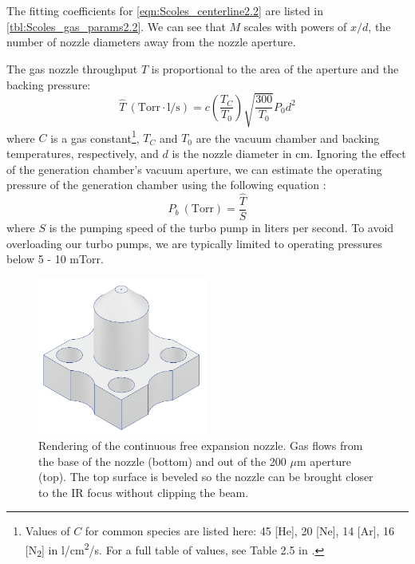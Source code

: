 The fitting coefficients for \cref{eqn:Scoles_centerline2.2} are listed in \cref{tbl:Scoles_gas_params2.2}. We can see that $M$ scales with powers of $x/d$, the number of nozzle diameters away from the nozzle aperture.

The gas nozzle throughput $\hat{T}$ is proportional to the area of the aperture and the backing pressure:
\begin{equation}
\hat{T} \ (\text{Torr} \cdot \text{l}/\text{s}) = c \left(\frac{T_C}{T_0} \right)\sqrt{\frac{300}{T_0}} P_0 d^2
\label{eqn:nozzle_thruput}
\end{equation}
where $C$ is a gas constant\footnote{Values of $C$ for common species are listed here: 45 [He], 20 [Ne], 14 [Ar], 16 [N\textsubscript{2}] in l/cm\textsuperscript{2}/s. For a full table of values, see Table 2.5 in \cite{millerFreeJetSources1988}.}, $T_C$ and $T_0$ are the vacuum chamber and backing temperatures, respectively, and $d$ is the nozzle diameter in cm. Ignoring the effect of the generation chamber's vacuum aperture, we can estimate the operating pressure of the generation chamber using the following equation \cite{hablanianHighvacuumTechnologyPractical1997}:
\begin{equation}
P_b \ (\text{Torr}) = \frac{\hat{T}}{S}
\end{equation}
where $S$ is the pumping speed of the turbo pump in liters per second. To avoid overloading our turbo pumps, we are typically limited to operating pressures below 5 - 10 mTorr.

\begin{figure}
	\centering
	\includegraphics[width=0.5\textwidth]{figures/chap3/gas_nozzle.png}
	\caption{Rendering of the continuous free expansion nozzle. Gas flows from the base of the nozzle (bottom) and out of the 200 $\mu$m aperture (top). The top surface is beveled so the nozzle can be brought closer to the IR focus without clipping the beam.}
	\label{fig:gas_nozzle}
\end{figure}

